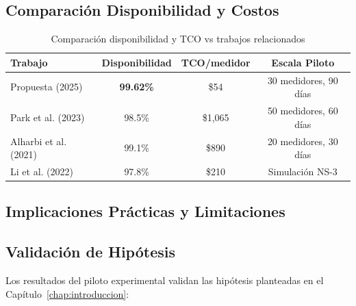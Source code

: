 
\subsection{Comparación Disponibilidad y Costos}

\begin{table}[H]
\centering
\caption{Comparación disponibilidad y TCO vs trabajos relacionados}
\label{tab:comparacion-disponibilidad-literatura}
\begin{tabular}{|l|c|c|c|}
\hline
\rowcolor{gray!20}
\textbf{Trabajo} & \textbf{Disponibilidad} & \textbf{TCO/medidor} & \textbf{Escala Piloto} \\
\hline
Propuesta (2025) & \textbf{99.62\%} & \$54 & 30 medidores, 90 días \\
\hline
Park et al. (2023) & 98.5\% & \$1,065 & 50 medidores, 60 días \\
\hline
Alharbi et al. (2021) & 99.1\% & \$890 & 20 medidores, 30 días \\
\hline
Li et al. (2022) & 97.8\% & \$210 & Simulación NS-3 \\
\hline
\end{tabular}
\end{table}

\subsection{Implicaciones Prácticas y Limitaciones}
\label{sec:res-implicaciones}

\subsection{Validación de Hipótesis}

Los resultados del piloto experimental validan las hipótesis planteadas en el Capítulo~\ref{chap:introduccion}:

